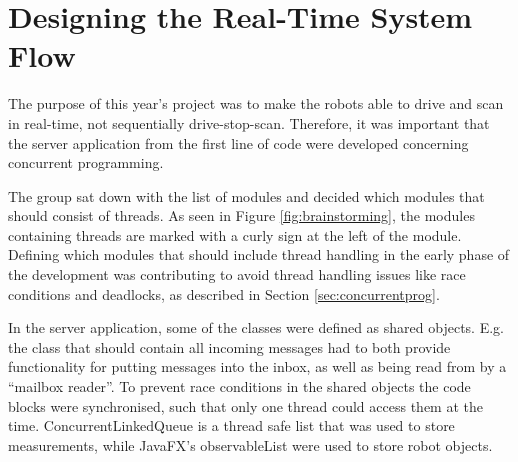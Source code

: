 \section{Designing the Real-Time System Flow}
The purpose of this year's project was to make the robots able to drive and scan in real-time, not sequentially drive-stop-scan. Therefore, it was important that the server application from the first line of code were developed concerning concurrent programming.

The group sat down with the list of modules and decided which modules that should consist of threads. As seen in Figure \ref{fig:brainstorming}, the modules containing threads are marked with a curly sign at the left of the module. Defining which modules that should include thread handling in the early phase of the development was contributing to avoid thread handling issues like race conditions and deadlocks, as described in Section \ref{sec:concurrentprog}.

In the server application, some of the classes were defined as shared objects. E.g. the class that should contain all incoming messages had to both provide functionality for putting messages into the inbox, as well as being read from by a ``mailbox reader''. To prevent race conditions in the shared objects the code blocks were synchronised, such that only one thread could access them at the time. ConcurrentLinkedQueue is a thread safe list that was used to store measurements, while JavaFX's observableList were used to store robot objects.